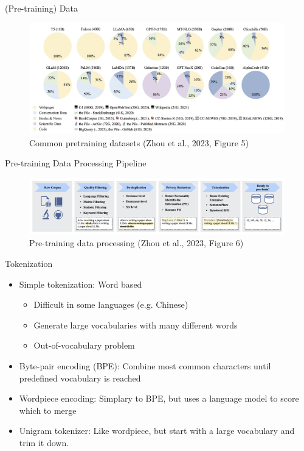 \documentclass[10pt]{beamer}
\begin{document}
\begin{frame}{(Pre-training) Data}

\begin{figure}[h]
\centering
\includegraphics[width=0.99\textwidth]{fig/zhou_2023_fig5}
\caption{Common pretraining datasets (Zhou et al., 2023, Figure 5)}
\end{figure}

\end{frame}


\begin{frame}{Pre-training Data Processing Pipeline}

\begin{figure}[h]
\centering
\includegraphics[width=0.99\textwidth]{fig/zhou_2023_fig6}
\caption{Pre-training data processing (Zhou et al., 2023, Figure 6)}
\end{figure}

\end{frame}



\begin{frame}{Tokenization}
\begin{itemize}
\item Simple tokenization: Word based
\begin{itemize}
\item Difficult in some languages (e.g. Chinese)
\item Generate large vocabularies with many different words
\item Out-of-vocabulary problem
\end{itemize}
\item Byte-pair encoding (BPE): Combine most common characters until predefined vocabulary is reached
\item Wordpiece encoding: Simplary to BPE, but uses a language model to score which to merge
\item Unigram tokenizer: Like wordpiece, but start with a large vocabulary and trim it down.
\end{itemize}

\end{frame}
\end{document}
